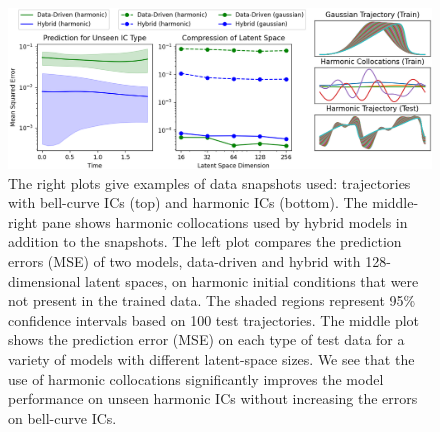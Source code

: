     \begin{figure}[ht!]
        \centering
        \includegraphics[width=\textwidth]{figures/burgers_compression.png}
        \caption{The right plots give examples of data snapshots used: trajectories with bell-curve ICs (top) and harmonic ICs (bottom). The middle-right pane shows harmonic collocations used by hybrid models in addition to the snapshots. The left plot compares the prediction errors (MSE) of two models, data-driven and hybrid with 128-dimensional latent spaces, on harmonic initial conditions that were not present in the trained data. The shaded regions represent 95\% confidence intervals based on 100 test trajectories. The middle plot shows the prediction error (MSE) on each type of test data for a variety of models with different latent-space sizes. We see that the use of harmonic collocations significantly improves the model performance on unseen harmonic ICs without increasing the errors on bell-curve ICs.}
        \label{fig:pikn_burgers_compression}
    \end{figure}
    
